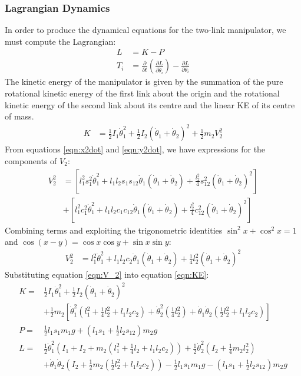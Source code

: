 \subsubsection*{Lagrangian Dynamics}
In order to produce the dynamical equations for the two-link manipulator, we must compute the Lagrangian:
\begin{align}
	L &= K - P\nonumber \\
	T_i &= \frac{\partial}{\partial{t}}\left(\frac{\partial{L}}{\partial{\dot{\theta}_i}}\right) - \frac{\partial{L}}{\partial{\theta_i}}\label{eqn:T_i}
\end{align}
The kinetic energy of the manipulator is given by the summation of the pure rotational kinetic energy of the first link about the origin and the rotational kinetic energy of the second link about its centre and the linear KE of its centre of mass.
\begin{align}
	K &= \frac{1}{2}I_1\dot{\theta}_1^2 + \frac{1}{2}I_2(\dot{\theta}_1 + \dot{\theta}_2)^2 + \frac{1}{2}m_2 V_2^2\label{eqn:KE}
\end{align}
From equations \ref{eqn:x2dot} and \ref{eqn:y2dot}, we have expressions for the components of $V_2$:
\begin{align*}
	V_2^2 &= \left[l_1^2 s_1^2 \dot{\theta}_1^2 + l_1 l_2 s_1 s_{12} \dot{\theta}_1(\dot{\theta}_1 + \dot{\theta}_2) + \frac{l_2^2}{4} s_{12}^2(\dot{\theta}_1 + \dot{\theta}_2)^2\right] \\
	& + \left[l_1^2 c_1^2 \dot{\theta}_1^2 + l_1 l_2 c_1 c_{12} \dot{\theta}_1(\dot{\theta}_1 + \dot{\theta}_2) + \frac{l_2^2}{4} c_{12}^2(\dot{\theta}_1 + \dot{\theta}_2)^2\right]
\end{align*}
Combining terms and exploiting the trigonometric identities $\sin^2{x} + \cos^2{x} = 1$ and $\cos(x - y) = \cos{x}\cos{y} + \sin{x}\sin{y}$:
\begin{align}
	V_2^2 &= l_1^2 \dot{\theta}_1^2 + l_1 l_2 c_2 \dot{\theta}_1(\dot{\theta}_1 + \dot{\theta}_2) + \frac{1}{4}l_2^2(\dot{\theta}_1 + \dot{\theta}_2)^2\label{eqn:V_2}
\end{align}
Substituting equation \ref{eqn:V_2} into equation \ref{eqn:KE}:
\begin{align}
	K =& \frac{1}{2}I_1\dot{\theta}_1^2 + \frac{1}{2}I_2\left(\dot{\theta}_1 + \dot{\theta}_2\right)^2\nonumber \\
	& + \frac{1}{2}m_2\left[\dot{\theta}_1^2\left(l_1^2 + \frac{1}{4}l_2^2 + l_1 l_2 c_2\right) + \dot{\theta}_2^2\left(\frac{1}{4}l_2^2\right) + \dot{\theta}_1\dot{\theta}_2\left(\frac{1}{2}l_2^2 + l_1 l_2 c_2\right)\right]\nonumber \\
	P =& \frac{1}{2}l_1 s_1 m_1 g + \left(l_1 s_1 + \frac{1}{2}l_2 s_{12}\right)m_2 g\nonumber \\
	L =& \frac{1}{2}\dot{\theta}_1^2 \left(I_1 + I_2 + m_2\left(l_1^2 + \frac{1}{4}l_2 + l_1 l_2 c_2 \right) \right) + \frac{1}{2}\dot{\theta}_2^2\left(I_2 + \frac{1}{4}m_2 l_2^2 \right)\nonumber \\
	& + \dot{\theta}_1\dot{\theta}_2 \left(I_2 + \frac{1}{2}m_2 \left(\frac{1}{2}l_2^2 + l_1 l_2 c_2 \right) \right) - \frac{1}{2}l_1 s_1 m_1 g - \left(l_1 s_1 + \frac{1}{2}l_2 s_{12}\right)m_2 g\label{eqn:L}
\end{align}
